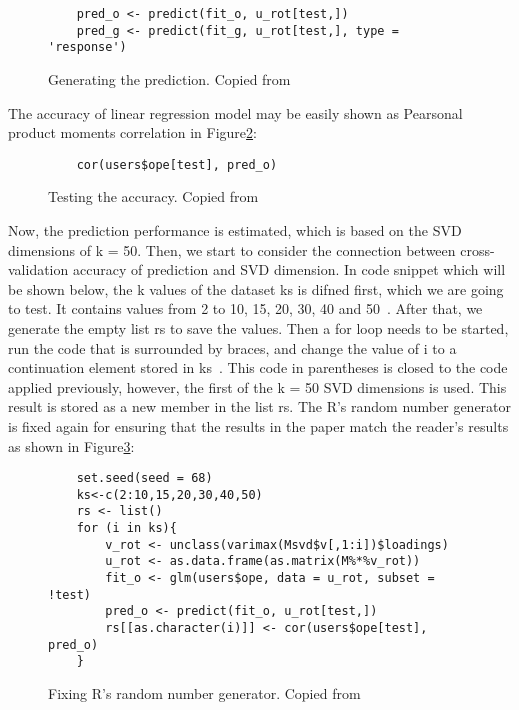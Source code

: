 \begin{figure}[htb]
\begin{footnotesize}
\begin{verbatim}
    pred_o <- predict(fit_o, u_rot[test,])
    pred_g <- predict(fit_g, u_rot[test,], type = 'response')
\end{verbatim}
\end{footnotesize}
\caption{Generating the prediction. Copied from~\cite{hid515-12}}
\label{F:generate}
\end{figure}

The accuracy of linear regression model may be easily 
shown as Pearsonal product moments correlation in Figure\ref{F:accuracy}:

\begin{figure}[htb]
\begin{footnotesize}
\begin{verbatim}
    cor(users$ope[test], pred_o)
\end{verbatim}
\end{footnotesize}
\caption{Testing the accuracy. Copied from~\cite{hid515-12}}
\label{F:accuracy}
\end{figure}


Now, the prediction performance is estimated, which is based 
on the SVD dimensions of k = 50. Then, we start to consider the 
connection between
 cross-validation accuracy of prediction and SVD dimension. 
In code snippet which will be shown below, the k values of 
the dataset ks is difned first, which we are going to test. 
It contains values from 2 to 10, 15,
 20, 30, 40 and 50~\cite{hid515-12}. 
After that, we generate the empty list rs to save the values. 
Then a for loop needs to be started, run the code that is 
surrounded by braces, and change the value of i to a continuation 
element stored in ks~\cite{hid515-12}. 
This code in parentheses is closed to the code applied previously,
 however, the first of the k = 50 SVD dimensions is used. This 
result is stored as a new member in the 
list rs. The R's random number generator is fixed
 again for ensuring that the results in the paper match the 
reader's results as shown
 in Figure\ref{F:Fixing R's random number generator}:


\begin{figure}[htb]
\begin{footnotesize}
\begin{verbatim}
    set.seed(seed = 68)
    ks<-c(2:10,15,20,30,40,50)
    rs <- list()
    for (i in ks){
        v_rot <- unclass(varimax(Msvd$v[,1:i])$loadings)
        u_rot <- as.data.frame(as.matrix(M%*%v_rot))
        fit_o <- glm(users$ope, data = u_rot, subset = !test)
        pred_o <- predict(fit_o, u_rot[test,])
        rs[[as.character(i)]] <- cor(users$ope[test], pred_o)
    }
\end{verbatim}
\end{footnotesize}
\caption{Fixing R's random number generator. 
Copied from~\cite{hid515-12}}
\label{F:Fixing R's random number generator}
\end{figure}


